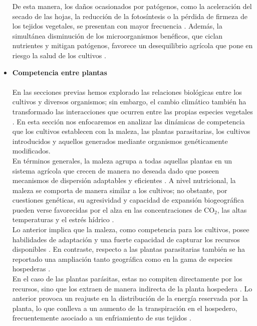 \begin{itemize}[leftmargin=0cm, itemsep=0.5 cm]
	De esta manera, los daños ocasionados por patógenos, como la aceleración del secado de las hojas, la reducción de la fotosíntesis o la pérdida de firmeza de los tejidos vegetales, se presentan con mayor frecuencia \cite{Savary_2020}. Además, la simultánea disminución de los microorganismos benéficos, que ciclan nutrientes y mitigan patógenos, favorece un desequilibrio agrícola que pone en riesgo la salud de los cultivos \cite{Jansson_2020}.
	
	\item[]\textbf{Competencia entre plantas\\}\\
	
	En las secciones previas hemos explorado las relaciones biológicas entre los cultivos y diversos organismos; sin embargo, el cambio climático también ha transformado las interacciones que ocurren entre las propias especies vegetales \cite{Guo_2025}. En esta sección nos enfocaremos en analizar las dinámicas de competencia que los cultivos establecen con la maleza, las plantas parasitarias, los cultivos introducidos y aquellos generados mediante organismos genéticamente modificados.\\
	
	En términos generales, la maleza agrupa a todas aquellas plantas en un sistema agrícola que crecen de manera no deseada dado que poseen mecanismos de dispersión adaptables y eficientes \cite{Rana_2016}. A nivel nutricional, la maleza se comporta de manera similar a los cultivos; no obstante, por cuestiones genéticas, su agresividad y capacidad de expansión biogeográfica pueden verse favorecidas por el alza en las concentraciones de CO$_2$, las altas temperaturas y el estrés hídrico \cite{Upasani_2018}.\\
	
	Lo anterior implica que la maleza, como competencia para los cultivos, posee habilidades de adaptación y una fuerte capacidad de capturar los recursos disponibles \cite{Rana_2016}. En contraste, respecto a las plantas parasitarias también se ha reportado una ampliación tanto geográfica como en la gama de especies hospederas \cite{Zamora_2019}.\\
	
	En el caso de las plantas parásitas, estas no compiten directamente por los recursos, sino que los extraen de manera indirecta de la planta hospedera \cite{Watson_2022}. Lo anterior provoca un reajuste en la distribución de la energía reservada por la planta, lo que conlleva a un aumento de la transpiración en el hospedero, frecuentemente asociado a un enfriamiento de sus tejidos \cite{Pincebourde_2019}.\\
	

\end{itemize}

